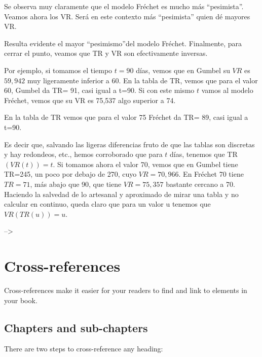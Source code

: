 \documentclass[
]{book}
\theoremstyle{definition}
\theoremstyle{definition}
\theoremstyle{definition}
\theoremstyle{definition}
\theoremstyle{remark}
\begin{document}
Se observa muy claramente que el modelo Fréchet es mucho más ``pesimista''. Veamos ahora los VR. Será en este contexto más ``pesimista'' quien dé mayores VR.

Resulta evidente el mayor ``pesimismo''del modelo Fréchet.
Finalmente, para cerrar el punto, veamos que TR y VR son efectivamente inversas.

Por ejemplo, si tomamos el tiempo \(t=90\) días, vemos que en Gumbel su \(VR\) es \(59,942\) muy ligeramente inferior a 60. En la tabla de TR, vemos que para el valor 60, Gumbel da TR= 91, casi igual a t=90. Si con este mismo \(t\) vamos al modelo Fréchet, vemos que su VR es 75,537 algo superior a 74.

En la tabla de TR vemos que para el valor 75 Fréchet da TR= 89, casi igual a t=90.

Es decir que, salvando las ligeras diferencias fruto de que las tablas son discretas y hay redondeos, etc., hemos corroborado que para \(t\) días, tenemos que TR \((VR(t))=t\).
Si tomamos ahora el valor 70, vemos que en Gumbel tiene TR=245, un poco por debajo de 270, cuyo \(VR=70,966\). En Fréchet 70 tiene \(TR=71\), más abajo que 90, que tiene \(VR= 75,357\) bastante cercano a 70.
Haciendo la salvedad de lo artesanal y aproximado de mirar una tabla y no calcular en continuo, queda claro que para un valor u tenemos que \(VR(TR(u))=u\).

--\textgreater{}

\chapter{Cross-references}\label{cross}

Cross-references make it easier for your readers to find and link to elements in your book.

\section{Chapters and sub-chapters}\label{chapters-and-sub-chapters}

There are two steps to cross-reference any heading:
\end{document}
